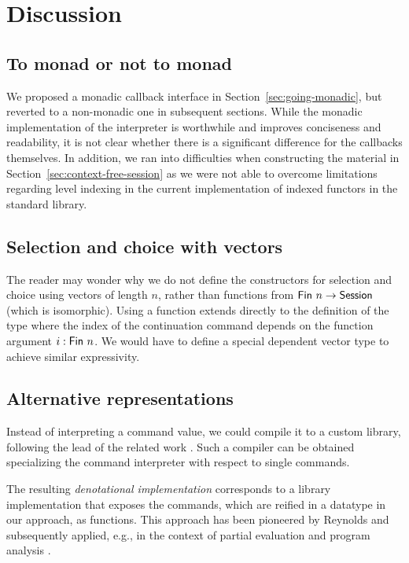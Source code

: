 \documentclass[acmsmall,screen]{acmart}
\begin{document}
\section{Discussion}
\label{sec:discussion}

\subsection{To monad or not to monad}
\label{sec:monad-or-not}

We proposed a monadic callback interface in Section~\ref{sec:going-monadic},
but reverted to a non-monadic one in subsequent sections. While the
monadic implementation of the interpreter is worthwhile and improves
conciseness and readability, it is not clear whether there is a
significant difference for the callbacks themselves.
In addition, we ran into difficulties when constructing the material in
Section~\ref{sec:context-free-session} as we were not able to overcome
limitations regarding level indexing in the current implementation
of indexed functors in the standard library.

\subsection{Selection and choice with vectors}
\label{sec:select-choice-with}

The reader may wonder why we do not define the constructors for
selection and choice using vectors of length $n$, rather than
functions from $\AFin~n \to \ASession$ (which is isomorphic). Using a function extends
directly to the definition of the {\ACommand} type where the {\ASession} index of the
continuation command depends on the function argument $i : \AFin~n$.
We would have to define a special dependent vector type to achieve similar
expressivity. 

\subsection{Alternative representations}
\label{sec:code-generation}

Instead of interpreting a command value, we could compile it to a
custom library, following the lead of the related work
\cite{DBLP:journals/pacmpl/00020HNY20,DBLP:conf/cc/Miu0Y021}.
Such a compiler can be obtained specializing the command interpreter
with respect to single commands.

The resulting \emph{denotational implementation} corresponds to a library implementation that exposes
the commands, which are reified in a datatype in our approach, as
functions. This approach has been pioneered by Reynolds \cite{Reynolds1994} and
subsequently applied, e.g., in the context of partial evaluation and
program analysis
\cite{DBLP:journals/jfp/Thiemann99,DBLP:journals/jfp/CaretteKS09}.
\end{document}
